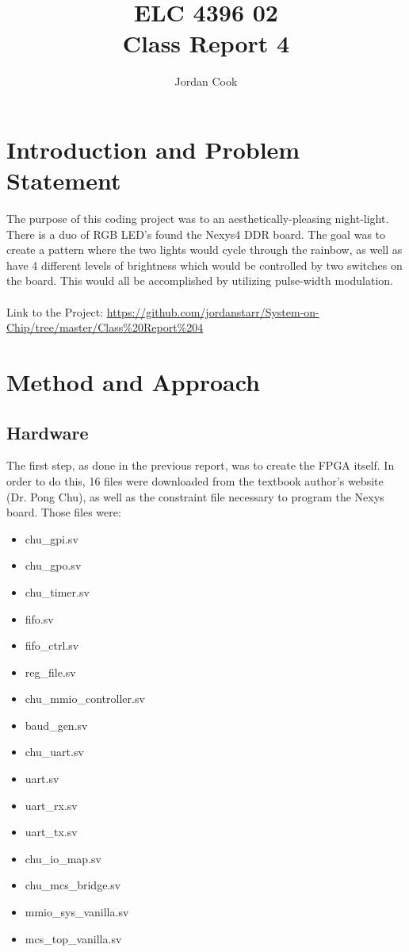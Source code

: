 \documentclass[11pt]{article}
\begin{document}
\title{ELC 4396 02 \\ Class Report 4}
\author{Jordan Cook}

\maketitle


\section{Introduction and Problem Statement} 

\quad The purpose of this coding project was to an aesthetically-pleasing night-light. There is a duo of RGB LED's found the Nexys4 DDR board. The goal was to create a pattern where the two lights would cycle through the rainbow, as well as have 4 different levels of brightness which would be controlled by two switches on the board. This would all be accomplished by utilizing pulse-width modulation.
\\\\ Link to the Project: \url{https://github.com/jordanstarr/System-on-Chip/tree/master/Class%20Report%204}

\section{Method and Approach}

\subsection{Hardware}

\quad The first step, as done in the previous report, was to create the FPGA itself. In order to do this, 16 files were downloaded from the textbook author's website (Dr. Pong Chu), as well as the constraint file necessary to program the Nexys board. Those files were: 

\begin{multicols}{2}
\begin{itemize}
	\item chu\_gpi.sv
	\item chu\_gpo.sv 
	\item chu\_timer.sv 
	\item fifo.sv 
	\item fifo\_ctrl.sv 
	\item reg\_file.sv
	\item chu\_mmio\_controller.sv 
	\item baud\_gen.sv 
	\item chu\_uart.sv 
	\item uart.sv 
	\item uart\_rx.sv 
	\item uart\_tx.sv 
	\item chu\_io\_map.sv 
	\item chu\_mcs\_bridge.sv 
	\item mmio\_sys\_vanilla.sv 
	\item mcs\_top\_vanilla.sv
\end{itemize}
\end{multicols} 
\end{document}
